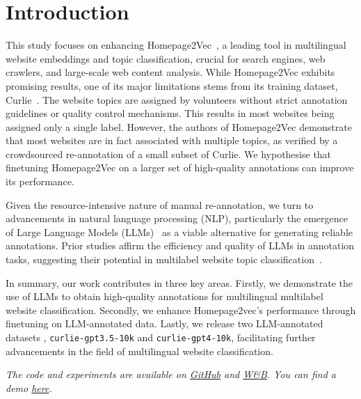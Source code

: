 \section{Introduction}

This study focuses on enhancing Homepage2Vec~\cite{homepage2vec}, a leading tool in multilingual website embeddings and topic classification, crucial for search engines, web crawlers, and large-scale web content analysis. While Homepage2Vec exhibits promising results, one of its major limitations stems from its training dataset, Curlie~\cite{curlie}. The website topics are assigned by volunteers without strict annotation guidelines or quality control mechanisms. This results in most websites being assigned only a single label. However, the authors of Homepage2Vec demonstrate that most websites are in fact associated with multiple topics, as verified by a crowdsourced re-annotation of a small subset of Curlie. We hypothesise that finetuning Homepage2Vec on a larger set of high-quality annotations can improve its performance.

Given the resource-intensive nature of manual re-annotation, we turn to advancements in natural language processing (NLP), particularly the emergence of Large Language Models (LLMs)~\cite{gpt3, gpt4} as a viable alternative for generating reliable annotations. Prior studies affirm the efficiency and quality of LLMs in annotation tasks, suggesting their potential in multilabel website topic classification~\cite{is-gpt3-good-annot,prompt-tuning,annollm,reduce-labeling-cost}.

In summary, our work contributes in three key areas. Firstly, we demonstrate the use of LLMs to obtain high-quality annotations for multilingual multilabel website classification. Secondly, we enhance Homepage2vec's performance through finetuning on LLM-annotated data. Lastly, we release two LLM-annotated datasets \cite{curlie-gpt-10k}, \texttt{curlie-gpt3.5-10k} and \texttt{curlie-gpt4-10k}, facilitating further advancements in the field of multilingual website classification.

\textit{The code and experiments are available on \href{https://github.com/CS-433/ml-project-2-mlp}{GitHub} and \href{https://wandb.ai/ml-project-2-mlp/homepage2vec}{W\&B}. You can find a demo \href{https://huggingface.co/spaces/ludekcizinsky/homepage2vec}{here}.}
